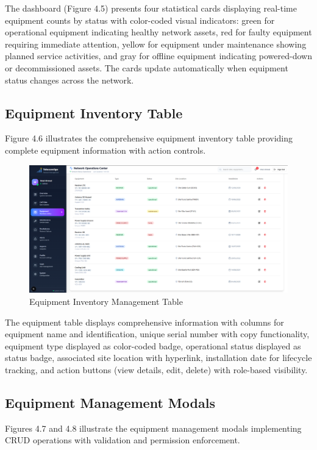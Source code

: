 The dashboard (Figure 4.5) presents four statistical cards displaying real-time equipment counts by status with color-coded visual indicators: green for operational equipment indicating healthy network assets, red for faulty equipment requiring immediate attention, yellow for equipment under maintenance showing planned service activities, and gray for offline equipment indicating powered-down or decommissioned assets. The cards update automatically when equipment status changes across the network.

\subsection{Equipment Inventory Table}

Figure 4.6 illustrates the comprehensive equipment inventory table providing complete equipment information with action controls.

\begin{figure}[H]
    \centering
    \includegraphics[width=0.9\linewidth]{img/chap_04/equipment_table.png}
    \caption{Equipment Inventory Management Table}
    \label{fig:equipment_table}
\end{figure}

The equipment table displays comprehensive information with columns for equipment name and identification, unique serial number with copy functionality, equipment type displayed as color-coded badge, operational status displayed as status badge, associated site location with hyperlink, installation date for lifecycle tracking, and action buttons (view details, edit, delete) with role-based visibility.

\subsection{Equipment Management Modals}

Figures 4.7 and 4.8 illustrate the equipment management modals implementing CRUD operations with validation and permission enforcement.

